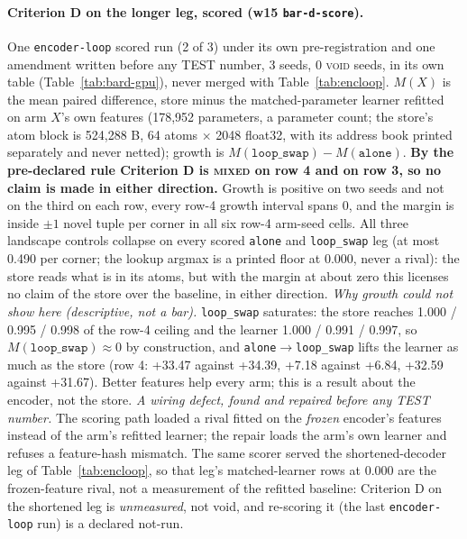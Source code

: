 \documentclass{article} %
\begin{document}
\paragraph{Criterion D on the longer leg, scored (w15 \texttt{bar-d-score}).} One
\texttt{encoder-loop} scored run (2 of 3) under its own pre-registration and one amendment
written before any TEST number, 3 seeds, 0 \textsc{void} seeds, in its own table %
(Table~\ref{tab:bard-gpu}), never merged with Table~\ref{tab:encloop}. $M(X)$ is the mean paired
difference, store minus the matched-parameter learner refitted on arm $X$'s own features (178,952 %
parameters, a parameter count; the store's atom block is 524,288 B, 64 atoms $\times$ 2048 %
float32, with its address book printed separately and never netted); growth is
$M(\texttt{loop\_swap})-M(\texttt{alone})$. \textbf{By the pre-declared rule Criterion D is
\textsc{mixed} on row 4 and on row 3, so no claim is made in either direction.} Growth is positive
on two seeds and not on the third on each row, every row-4 growth interval spans 0, and the
margin is inside $\pm1$ novel tuple per corner in all six row-4 arm-seed cells. All three
landscape controls collapse on every scored \texttt{alone} and \texttt{loop\_swap} leg (at most %
0.490 per corner; the lookup argmax is a printed floor at 0.000, never a rival): the store reads %
what is in its atoms, but with the margin at about zero this licenses no claim of the store over
the baseline, in either direction.
\emph{Why growth could not show here (descriptive, not a bar).} \texttt{loop\_swap} saturates: the
store reaches 1.000 / 0.995 / 0.998 of the row-4 ceiling and the learner 1.000 / 0.991 / 0.997, so %
$M(\texttt{loop\_swap})\approx0$ by construction, and \texttt{alone}$\to$\texttt{loop\_swap} lifts
the learner as much as the store (row 4: +33.47 against +34.39, +7.18 against +6.84, +32.59 %
against +31.67). Better features help every arm; this is a result about the encoder, not the store. %
\emph{A wiring defect, found and repaired before any TEST number.} The scoring path loaded a
rival fitted on the \emph{frozen} encoder's features instead of the arm's refitted learner; the
repair loads the arm's own learner and refuses a feature-hash mismatch. The same scorer served
the shortened-decoder leg of Table~\ref{tab:encloop}, so that leg's matched-learner rows at 0.000
are the frozen-feature rival, not a measurement of the refitted baseline: Criterion D on the
shortened leg is \emph{unmeasured}, not void, and re-scoring it (the last \texttt{encoder-loop}
run) is a declared not-run. %
\end{document}
